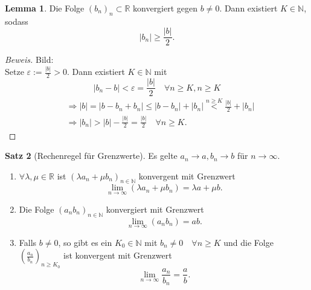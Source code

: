 \documentclass[12pt,a4paper,titlepage]{article} %
\theoremstyle{definition}
\newtheorem{satz}{Satz}[subsection]
\newtheorem{lem}[satz]{Lemma}
\theoremstyle{remark}
\newenvironment{bew}{\begin{proof}[Beweis]}{\end{proof}}
\newcommand{\N}{\mathbb{N}}
\newcommand{\R}{\mathbb{R}}
\begin{document}
\begin{lem}
	Die Folge $(b_n)_n \subset \R$ konvergiert gegen $b\neq 0$. Dann existiert $K\in\N$, sodass 
	$$|b_n| \geq \frac{|b|}{2}.$$
\end{lem}
\begin{bew}
	Bild: \\%
	Setze $\varepsilon := \frac{|b|}{2}>0$. Dann existiert $K\in\N$ mit $$|b_n-b| < \varepsilon = \frac{|b|}{2} \quad\forall n\geq K, n\geq K$$
	\begin{align*}
		&\Rightarrow |b| = |b-b_n + b_n| \leq |b-b_n| + |b_n| \overset{n\geq K}{<} \frac{|b|}{2} + |b_n|\\
		&\Rightarrow |b_n| > |b| - \frac{|b|}{2} = \frac{|b|}{2} \quad \forall n\geq K.
	\end{align*}
\end{bew}
\begin{satz}[Rechenregel für Grenzwerte]
	Es gelte $a_n\rightarrow a, b_n \rightarrow b$ für $n\rightarrow\infty$.
	\begin{enumerate}
		\item $\forall \lambda, \mu \in\R$ ist $(\lambda a_n + \mu b_n)_{n\in\N}$ konvergent mit Grenzwert $$\lim\limits_{n\rightarrow\infty} (\lambda a_n + \mu b_n) = \lambda a + \mu b.$$
		\item Die Folge $(a_nb_n)_{n\in\N}$ konvergiert mit Grenzwert $$\lim\limits_{n\rightarrow\infty} (a_nb_n) = ab.$$
		\item Falls $b\neq 0$, so gibt es ein $K_0 \in\N$ mit $b_n \neq 0 \quad \forall n\geq K$ und die Folge $\left(\frac{a_n}{b_n}\right)_{n\geq K_0}$ ist konvergent mit Grenzwert $$\lim\limits_{n\rightarrow\infty} \frac{a_n}{b_n} = \frac{a}{b}.$$
	\end{enumerate}
\end{satz}
\end{document}
